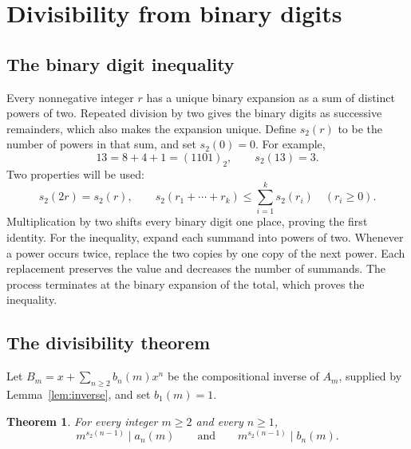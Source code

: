 \documentclass[11pt,a4paper]{article}
\newtheorem{theorem}{Theorem}[section]
\theoremstyle{remark}
\begin{document}
\section{Divisibility from binary digits}

\subsection{The binary digit inequality}

Every nonnegative integer $r$ has a unique binary expansion as a sum of
distinct powers of two. Repeated division by two gives the binary digits as
successive remainders, which also makes the expansion unique.
Define $s_2(r)$ to be the number of powers in that
sum, and set $s_2(0)=0$. For example,
\[
 13=8+4+1=(1101)_2,\qquad s_2(13)=3.
\]
Two properties will be used:
\begin{equation}\label{eq:digits}
 s_2(2r)=s_2(r),\qquad
 s_2(r_1+\cdots+r_k)\le\sum_{i=1}^{k}s_2(r_i)
 \quad(r_i\ge0).
\end{equation}
Multiplication by two shifts every binary digit one place, proving the
first identity. For the inequality, expand each summand into powers of
two. Whenever a power occurs twice, replace the two copies by one copy of
the next power. Each replacement preserves the value and decreases the
number of summands. The process terminates at the binary expansion of the
total, which proves the inequality.

\subsection{The divisibility theorem}

Let $B_m=x+\sum_{n\ge2}b_n(m)x^n$ be the compositional inverse of
$A_m$, supplied by Lemma~\ref{lem:inverse}, and set $b_1(m)=1$.

\begin{theorem}\label{thm:binary}
For every integer $m\ge2$ and every $n\ge1$,
\begin{equation}\label{eq:binary}
 m^{s_2(n-1)}\mid a_n(m)
 \qquad\text{and}\qquad
 m^{s_2(n-1)}\mid b_n(m).
\end{equation}
\end{theorem}
\end{document}
